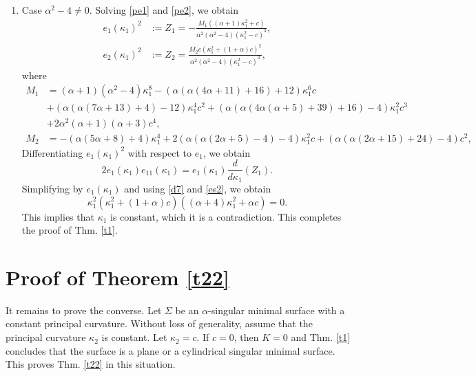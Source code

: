\documentclass{birkjour}
\theoremstyle{definition}
\theoremstyle{remark}
\numberwithin{equation}{section}
\begin{document}
\begin{enumerate}
\begin{enumerate}
 \item Case $\alpha^2-4\not=0$.  Solving \eqref{pe1} and \eqref{pe2}, we obtain 
\begin{equation}\label{es2}
\begin{split}
e_1(\kappa_1)^2&:=Z_1=-\frac{M_1\left((\alpha +1) \kappa_1^2+c\right)}{\alpha ^2 \left(\alpha ^2-4\right) \left(\kappa_1^2-c\right)^3},\\
e_2(\kappa_1)^2&:=Z_2=\frac{M_2 c \left(\kappa_1^2+(1+\alpha)c\right)^2}{\alpha ^2 \left(\alpha ^2-4\right) \left(\kappa_1^2-c\right)^3},
\end{split}
\end{equation}
where 
\begin{equation*}
\begin{split}
M_1&=    (\alpha +1) (\alpha^2 -4) \kappa_1^8-(\alpha  (\alpha  (4 \alpha +11)+16)+12) \kappa_1^6 c\\
&+(\alpha  (\alpha  (7 \alpha +13)+4)-12) \kappa_1^4 c^2+(\alpha  (\alpha  (4 \alpha  (\alpha +5)+39)+16)-4) \kappa_1^2 c^3\\
&+2 \alpha ^2 (\alpha +1) (\alpha +3) c^4,\\
M_2&=   -(\alpha  (5 \alpha +8)+4) \kappa_1^4+2 (\alpha  (\alpha  (2 \alpha +5)-4)-4) \kappa_1^2 c+(\alpha  (\alpha  (2 \alpha +15)+24)-4) c^2,
\end{split}
\end{equation*}
Differentiating $e_1(\kappa_1)^2$ with respect to $e_1$, we obtain 
$$2 e_1(\kappa_1)e_{11}(\kappa_1)=e_1(\kappa_1)\frac{d}{d\kappa_1}\left(Z_1\right).$$
  Simplifying by $e_1(\kappa_1)$ and using \eqref{d7} and \eqref{es2}, we obtain 
$$ \kappa_1^2 \left(\kappa_1^2+(1+\alpha)c\right) \left((\alpha +4) \kappa_1^2+\alpha  c\right)=0.$$
This implies that $\kappa_1$ is constant, which it is a contradiction. This completes the proof of Thm. \ref{t1}.
\end{enumerate}
 \end{enumerate}

  
\section{Proof of Theorem \ref{t22}}\label{s5}

 
It remains to prove the converse. Let $\Sigma$ be an $\alpha$-singular minimal surface with a constant principal curvature.    Without loss of generality, assume that  the principal curvature $\kappa_2$ is constant. Let $\kappa_2=c$. If $c=0$, then $K=0$ and Thm. \ref{t1} concludes that the surface is a plane or a cylindrical  singular minimal  surface. This proves Thm. \ref{t22} in this situation. 
 
\end{document}
